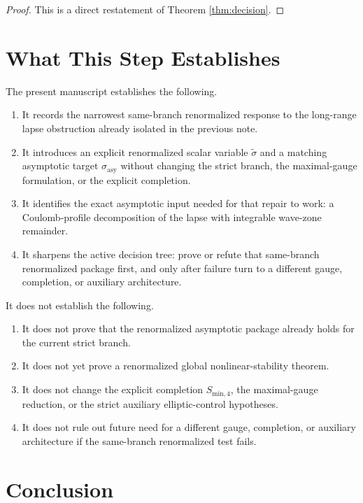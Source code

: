 \documentclass[11pt]{article}
\begin{document}
\begin{proof}
This is a direct restatement of Theorem \ref{thm:decision}.
\end{proof}

\section{What This Step Establishes}

The present manuscript establishes the following.
\begin{enumerate}
    \item It records the narrowest same-branch renormalized response to the long-range lapse obstruction already isolated in the previous note.
    \item It introduces an explicit renormalized scalar variable \(\widetilde{\sigma}\) and a matching asymptotic target \(\sigma_{\mathrm{asy}}\) without changing the strict branch, the maximal-gauge formulation, or the explicit completion.
    \item It identifies the exact asymptotic input needed for that repair to work: a Coulomb-profile decomposition of the lapse with integrable wave-zone remainder.
    \item It sharpens the active decision tree: prove or refute that same-branch renormalized package first, and only after failure turn to a different gauge, completion, or auxiliary architecture.
\end{enumerate}

It does not establish the following.
\begin{enumerate}
    \item It does not prove that the renormalized asymptotic package already holds for the current strict branch.
    \item It does not yet prove a renormalized global nonlinear-stability theorem.
    \item It does not change the explicit completion \(S_{\mathrm{min},4}\), the maximal-gauge reduction, or the strict auxiliary elliptic-control hypotheses.
    \item It does not rule out future need for a different gauge, completion, or auxiliary architecture if the same-branch renormalized test fails.
\end{enumerate}

\section{Conclusion}
\end{document}
